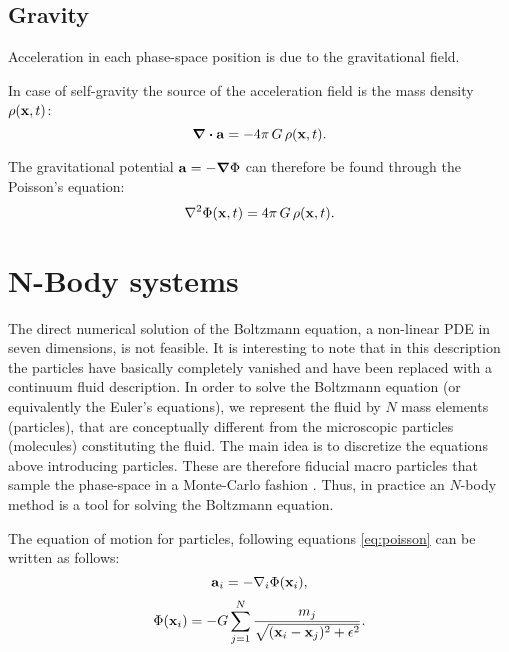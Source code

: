 \subsection{Gravity}
Acceleration in each phase-space position is due to the gravitational field.

In case of self-gravity the source of the acceleration field is the mass density $\rho(\boldsymbol{\mathbf{x}}, t)$:
\begin{equation}
 \div \boldsymbol{\mathbf{a}} = - 4 \pi \,G \, \rho(\boldsymbol{\mathbf{x}}, t).
\end{equation}

The gravitational potential $\boldsymbol{\mathbf{a}} = - \grad \Phi$ can therefore be found through the Poisson's equation:
\begin{equation}
 \label{eq:poisson}
 \laplacian \Phi(\vect x,t) = 4 \pi \,G \, \rho(\vect x, t).
\end{equation}


\section{N-Body systems}
The direct numerical solution of the Boltzmann equation, a non-linear PDE in seven dimensions, is not feasible.
It is interesting to note that in this description the particles have basically completely vanished and have been replaced with a continuum fluid description.
In order to solve the Boltzmann equation (or equivalently the Euler's equations), we represent the fluid by $N$ mass elements (particles), that are conceptually different from the microscopic particles (molecules) constituting the fluid.
The main idea is to discretize the equations above introducing particles.
These are therefore fiducial macro particles that sample the phase-space in a Monte-Carlo fashion \citep{Springel2015}.
Thus, in practice an $N$-body method is a tool for solving the Boltzmann equation.

The equation of motion for particles, following equations \eqref{eq:poisson} can be written as follows:
\begin{equation}
 \boldsymbol{\mathbf{a}}_i = -\nabla_i \Phi(\boldsymbol{\mathbf{x}}_i),
\end{equation}
\begin{equation}
 \Phi(\boldsymbol{\mathbf{x}}_i) = -G \sum^N_{j=1}\frac{m_j}{\sqrt{(\boldsymbol{\mathbf{x}}_i-\boldsymbol{\mathbf{x}}_j)^2 + \epsilon^2}}.
\end{equation}

